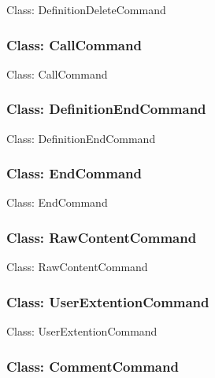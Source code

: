 \documentclass[11pt,twoside,openany,x11names,svgnames]{memoir}
\begin{document}
Class: DefinitionDeleteCommand

\subsubsection{Class: CallCommand}\label{Class-CallCommand}

Class: CallCommand

\subsubsection{Class: DefinitionEndCommand}\label{Class-DefinitionEndCommand}

Class: DefinitionEndCommand

\subsubsection{Class: EndCommand}\label{Class-EndCommand}

Class: EndCommand

\subsubsection{Class: RawContentCommand}\label{Class-RawContentCommand}

Class: RawContentCommand

\subsubsection{Class: UserExtentionCommand}\label{Class-UserExtentionCommand}

Class: UserExtentionCommand

\subsubsection{Class: CommentCommand}\label{Class-CommentCommand}
\end{document}
